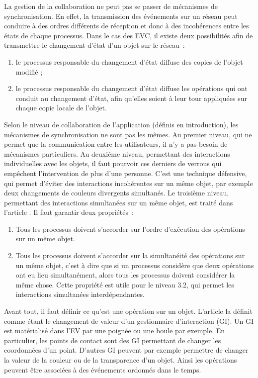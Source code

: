 \documentclass[11pt]{article}
\begin{document}
La gestion de la collaboration ne peut pas se passer de mécanismes de synchronisation. En effet, la transmission des événements sur un réseau peut conduire à des ordres différents de réception et donc à des incohérences entre les états de chaque processus. Dans le cas des EVC, il existe deux possibilités afin de transmettre le changement d'état d'un objet sur le réseau~:
\begin{enumerate}
	\item le processus responsable du changement d'état diffuse des copies de l'objet modifié ;
	\item le processus responsable du changement d'état diffuse les opérations qui ont conduit au changement d'état, afin qu'elles soient à leur tour appliquées sur chaque copie locale de l'objet.
\end{enumerate}

Selon le niveau de collaboration de l'application (définis en introduction), les mécanismes de synchronisation ne sont pas les mêmes. Au premier niveau, qui ne permet que la communication entre les utilisateurs, il n'y a pas besoin de mécanismes particuliers. Au deuxième niveau, permettant des interactions individuelles avec les objets, il faut pourvoir ces derniers de verrous qui empêchent l'intervention de plus d'une personne. C'est une technique défensive, qui permet d'éviter des interactions incohérentes sur un même objet, par exemple deux changements de couleurs divergents simultanés. Le troisième niveau, permettant des interactions simultanées sur un même objet, est traité dans l'article \cite{margery}. Il faut garantir deux propriétés~:
\begin{enumerate}
	\item Tous les processus doivent s'accorder sur l'ordre d'exécution des opérations sur un même objet.
	\item Tous les processus doivent s'accorder sur la simultanéité des opérations sur un même objet, c'est à dire que si un processus considère que deux opérations ont eu lieu simultanément, alors tous les processus doivent considérer la même chose. Cette propriété est utile pour le niveau 3.2, qui permet les interactions simultanées interdépendantes.
\end{enumerate}

Avant tout, il faut définir ce qu'est une opération sur un objet. L'article \cite{margery} la définit comme étant le changement de valeur d'un gestionnaire d'interaction (GI). Un GI est matérialisé dans l'EV par une poignée ou une boule par exemple. En particulier, les points de contact sont des GI permettant de changer les coordonnées d'un point. D'autres GI peuvent par exemple permettre de changer la valeur de la couleur ou de la transparence d'un objet. Ainsi les opérations peuvent être associées à des événements ordonnés dans le temps.
\\
\end{document}
